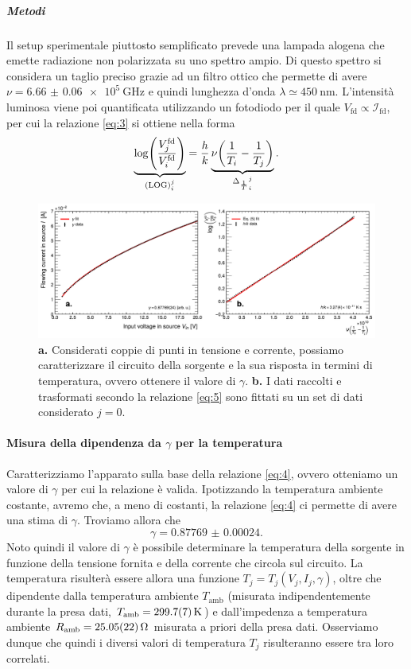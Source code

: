 \documentclass[a4paper, varvw, nofootinbib]{revtex4-2}
\begin{document}
\subparagraph*{Metodi}\label{sec:black_body_methods} Il setup sperimentale piuttosto semplificato prevede una lampada alogena che emette radiazione non polarizzata su uno spettro ampio. Di questo spettro si considera un taglio preciso grazie ad un filtro ottico che permette di avere $\nu = \SI{6.66(6)e+5}{\giga\hertz}$ e quindi lunghezza d'onda $\lambda \simeq \SI{450}{\nano\metre}$. L'intensità luminosa viene poi quantificata utilizzando un fotodiodo per il quale $V_\text{fd} \propto \mathcal I_\text{fd}$, per cui la relazione \eqref{eq:3} si ottiene nella forma \begin{equation}\underbrace{\log(\frac{V^\text{fd}_j}{V^\text{fd}_i})}_{(\text{LOG})_i^j} = \frac{h}{k}\underbrace{\nu\qty({1\over T_i} - {1\over T_j})}_{{\Delta_{\frac{1}{T}}}_i^j}. \label{eq:5}\end{equation}

\begin{figure}
    \centering
    \includegraphics[width=14cm]{fig/plot_hk}
    \caption{\textbf{a.} Considerati coppie di punti in tensione e corrente, possiamo caratterizzare il circuito della sorgente e la sua risposta in termini di temperatura, ovvero ottenere il valore di $\gamma$. \textbf{b.} I dati raccolti e trasformati secondo la relazione \eqref{eq:5} sono fittati su un set di dati considerato $j=0$.}
\end{figure}

\paragraph*{Misura della dipendenza da $\gamma$ per la temperatura} Caratterizziamo l'apparato sulla base della relazione \eqref{eq:4}, ovvero otteniamo un valore di $\gamma$ per cui la relazione è valida. Ipotizzando la temperatura ambiente costante, avremo che, a meno di costanti, la relazione \eqref{eq:4} ci permette di avere una stima di $\gamma$. Troviamo allora che \[\gamma = \num{0.87769(24)}.\] Noto quindi il valore di $\gamma$ è possibile determinare la temperatura della sorgente in funzione della tensione fornita e della corrente che circola sul circuito. La temperatura risulterà essere allora una funzione $T_j = T_j(V_j, I_j, \gamma)$, oltre che dipendente dalla temperatura ambiente $T_\text{amb}$ (misurata indipendentemente durante la presa dati, $T_\text{amb} = \SI{299.7 +- 0.7}{\kelvin}$) e dall'impedenza a temperatura ambiente $R_\text{amb} = \SI{25.045 +- 0.215}{\ohm}$ misurata a priori della presa dati. Osserviamo dunque che quindi i diversi valori di temperatura $T_j$ risulteranno essere tra loro correlati. 
\end{document}
